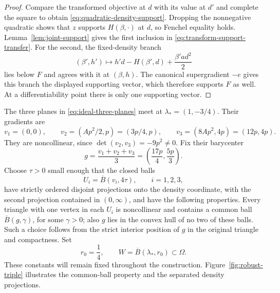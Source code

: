 \begin{proof}
Compare the transformed objective at $d$ with its value at $d'$ and complete
the square to obtain \eqref{eq:quadratic-density-support}. Dropping the
nonnegative quadratic shows that $z$ supports $H(\beta,\cdot)$ at $d$,
so Fenchel equality holds. Lemma~\ref{lem:joint-support} gives the first
inclusion in \eqref{eq:transform-support-transfer}. For the second, the
fixed-density branch
\[
 (\beta',h')\longmapsto h'd-H(\beta',d)+\frac{\beta'a d^2}{2}
\]
lies below $F$ and agrees with it at $(\beta,h)$. The canonical
supergradient $-e$ gives this branch the displayed supporting vector,
which therefore supports $F$ as well. At a differentiability point there
is only one supporting vector.
\end{proof}

The three planes in \eqref{eq:ideal-three-planes} meet at
\(\lambda_*=(1,-3/4)\).  Their gradients are
\begin{equation}\label{eq:triangle-vertices}
 v_1=(0,0),\qquad
 v_2=(Ap^2/2,p)=(3p/4,p),\qquad
 v_3=(8Ap^2,4p)=(12p,4p).
\end{equation}
They are noncollinear, since \(\det(v_2,v_3)=-9p^2\ne0\).
Fix their barycenter
\begin{equation}\label{eq:fixed-center}
 g=\frac{v_1+v_2+v_3}{3}
   =\left(\frac{17p}{4},\frac{5p}{3}\right).
\end{equation}
Choose \(\tau>0\) small enough that the closed balls
\[
 U_i=\overline B(v_i,4\tau),\qquad i=1,2,3,
\]
have strictly ordered disjoint projections onto the density coordinate,
with the second projection contained in \((0,\infty)\), and have the
following properties.  Every triangle with one vertex in each \(U_i\)
is noncollinear and contains a common ball
\(\overline B(g,\gamma)\), for some \(\gamma>0\); also \(g\) lies in the
convex hull of no two of these balls.  Such a choice follows from the
strict interior position of \(g\) in the original triangle and compactness.
Set
\[
 r_0=\frac14,\qquad W=\overline B(\lambda_*,r_0)\subset\Omega .
\]
These constants will remain fixed throughout the construction.
Figure~\ref{fig:robust-triple} illustrates the common-ball property and
the separated density projections.

